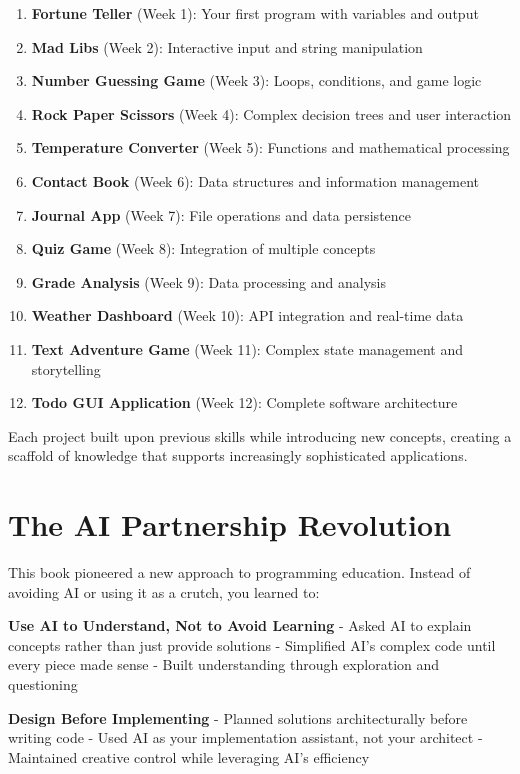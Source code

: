 \documentclass[
  letterpaper,
  DIV=11,
  numbers=noendperiod,
  oneside]{scrreprt}
\providecommand{\tightlist}{%
  \setlength{\itemsep}{0pt}\setlength{\parskip}{0pt}}\usepackage{longtable,booktabs,array}
\begin{document}
\begin{enumerate}
\def\labelenumi{\arabic{enumi}.}
\tightlist
\item
  \textbf{Fortune Teller} (Week 1): Your first program with variables
  and output
\item
  \textbf{Mad Libs} (Week 2): Interactive input and string manipulation
\item
  \textbf{Number Guessing Game} (Week 3): Loops, conditions, and game
  logic
\item
  \textbf{Rock Paper Scissors} (Week 4): Complex decision trees and user
  interaction
\item
  \textbf{Temperature Converter} (Week 5): Functions and mathematical
  processing
\item
  \textbf{Contact Book} (Week 6): Data structures and information
  management
\item
  \textbf{Journal App} (Week 7): File operations and data persistence
\item
  \textbf{Quiz Game} (Week 8): Integration of multiple concepts
\item
  \textbf{Grade Analysis} (Week 9): Data processing and analysis
\item
  \textbf{Weather Dashboard} (Week 10): API integration and real-time
  data
\item
  \textbf{Text Adventure Game} (Week 11): Complex state management and
  storytelling
\item
  \textbf{Todo GUI Application} (Week 12): Complete software
  architecture
\end{enumerate}

Each project built upon previous skills while introducing new concepts,
creating a scaffold of knowledge that supports increasingly
sophisticated applications.

\section{The AI Partnership
Revolution}\label{the-ai-partnership-revolution}

This book pioneered a new approach to programming education. Instead of
avoiding AI or using it as a crutch, you learned to:

\textbf{Use AI to Understand, Not to Avoid Learning} - Asked AI to
explain concepts rather than just provide solutions - Simplified AI's
complex code until every piece made sense - Built understanding through
exploration and questioning

\textbf{Design Before Implementing} - Planned solutions architecturally
before writing code - Used AI as your implementation assistant, not your
architect - Maintained creative control while leveraging AI's efficiency
\end{document}
